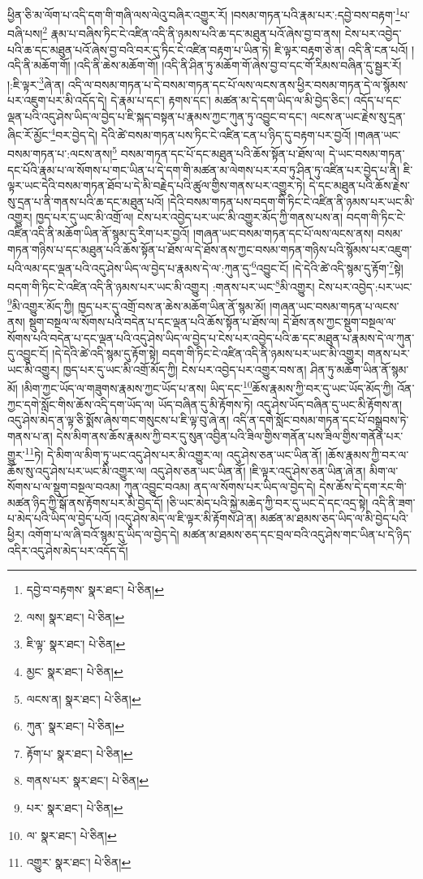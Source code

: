 ཕྱིན་ཅི་མ་ལོག་པ་འདི་དག་གི་གཞི་ལས་ལེའུ་བཞིར་འགྱུར་རོ། །བསམ་གཏན་པའི་རྣམ་པར་:དབྱེ་བས་བརྟག་\footnote{དབྱེ་བ་བརྟགས་  སྣར་ཐང་།  པེ་ཅིན། }པ་བཞི་པས།\footnote{ལས།  སྣར་ཐང་།  པེ་ཅིན། } རྣམ་པ་བཞིས་ཏིང་ངེ་འཛིན་འདི་ནི་ཉམས་པའི་ཆ་དང་མཐུན་པའོ་ཞེས་བྱ་བ་ནས། ངེས་པར་འབྱེད་པའི་ཆ་དང་མཐུན་པའོ་ཞེས་བྱ་བའི་བར་དུ་ཏིང་ངེ་འཛིན་བརྟག་པ་ཡིན་ཏེ། ཇི་ལྟར་བརྟག་ཅེ་ན། འདི་ནི་ངན་པའོ། །འདི་ནི་མཆོག་གོ། །འདི་ནི་ཆེས་མཆོག་གོ། །འདི་ནི་ཤིན་ཏུ་མཆོག་གོ་ཞེས་བྱ་བ་དང་གོ་རིམས་བཞིན་དུ་སྦྱར་རོ། །:ཇི་ལྟར་\footnote{ཇི་ལྟ་  སྣར་ཐང་།  པེ་ཅིན། }ཞེ་ན། འདི་ལ་བསམ་གཏན་པ་དེ་བསམ་གཏན་དང་པོ་ལས་ལངས་ནས་ཕྱིར་བསམ་གཏན་དེ་ལ་སྙོམས་པར་འཇུག་པར་མི་འདོད་དེ། དེ་རྣམ་པ་དང་། རྟགས་དང་། མཚན་མ་དེ་དག་ཡིད་ལ་མི་བྱེད་ཅིང་། འདོད་པ་དང་ལྡན་པའི་འདུ་ཤེས་ཡིད་ལ་བྱེད་པ་ཇི་སྐད་བསྟན་པ་རྣམས་ཀྱང་ཀུན་ཏུ་འབྱུང་བ་དང་། ལངས་ན་ཡང་རྗེས་སུ་དྲན་ཞིང་རོ་མྱོང་\footnote{མྱང་  སྣར་ཐང་།  པེ་ཅིན། }བར་བྱེད་དེ། དེའི་ཚེ་བསམ་གཏན་པས་ཏིང་ངེ་འཛིན་ངན་པ་ཉིད་དུ་བརྟག་པར་བྱའོ། །གཞན་ཡང་བསམ་གཏན་པ་:ལངས་ནས།\footnote{ལངས་ན།  སྣར་ཐང་།  པེ་ཅིན། } བསམ་གཏན་དང་པོ་དང་མཐུན་པའི་ཆོས་སྟོན་པ་ཐོས་ལ། དེ་ཡང་བསམ་གཏན་དང་པོའི་རྣམ་པ་ལ་སོགས་པ་གང་ཡིན་པ་དེ་དག་གི་མཚན་མ་ལེགས་པར་རབ་ཏུ་ཤིན་ཏུ་འཛིན་པར་བྱེད་པ་ནི། ཇི་ལྟར་ཡང་དེའི་བསམ་གཏན་ཐོབ་པ་དེ་མི་བརྗེད་པའི་ཚུལ་གྱིས་གནས་པར་འགྱུར་ཏེ། དེ་དང་མཐུན་པའི་ཆོས་རྗེས་སུ་དྲན་པ་ནི་གནས་པའི་ཆ་དང་མཐུན་པའོ། །དེའི་བསམ་གཏན་པས་བདག་གི་ཏིང་ངེ་འཛིན་ནི་ཉམས་པར་ཡང་མི་འགྱུར། ཁྱད་པར་དུ་ཡང་མི་འགྲོ་ལ། ངེས་པར་འབྱེད་པར་ཡང་མི་འགྱུར་མོད་ཀྱི་གནས་པས་ན། བདག་གི་ཏིང་ངེ་འཛིན་འདི་ནི་མཆོག་ཡིན་ནོ་སྙམ་དུ་རིག་པར་བྱའོ། །གཞན་ཡང་བསམ་གཏན་དང་པོ་ལས་ལངས་ནས། བསམ་གཏན་གཉིས་པ་དང་མཐུན་པའི་ཆོས་སྟོན་པ་ཐོས་ལ་དེ་ཐོས་ནས་ཀྱང་བསམ་གཏན་གཉིས་པའི་སྙོམས་པར་འཇུག་པའི་ལམ་དང་ལྡན་པའི་འདུ་ཤེས་ཡིད་ལ་བྱེད་པ་རྣམས་དེ་ལ་:ཀུན་དུ་\footnote{ཀུན་  སྣར་ཐང་།  པེ་ཅིན། }འབྱུང་ངོ། །དེ་དེའི་ཚེ་འདི་སྙམ་དུ་རྟོག་\footnote{རྟོག་པ་  སྣར་ཐང་།  པེ་ཅིན། }སྟེ། བདག་གི་ཏིང་ངེ་འཛིན་འདི་ནི་ཉམས་པར་ཡང་མི་འགྱུར། :གནས་པར་ཡང་\footnote{གནས་པར་  སྣར་ཐང་།  པེ་ཅིན། }མི་འགྱུར། ངེས་པར་འབྱེད་:པར་ཡང་\footnote{པར་  སྣར་ཐང་།  པེ་ཅིན། }མི་འགྱུར་མོད་ཀྱི། ཁྱད་པར་དུ་འགྲོ་བས་ན་ཆེས་མཆོག་ཡིན་ནོ་སྙམ་མོ། །གཞན་ཡང་བསམ་གཏན་པ་ལངས་ནས། སྡུག་བསྔལ་ལ་སོགས་པའི་བདེན་པ་དང་ལྡན་པའི་ཆོས་སྟོན་པ་ཐོས་ལ། དེ་ཐོས་ནས་ཀྱང་སྡུག་བསྔལ་ལ་སོགས་པའི་བདེན་པ་དང་ལྡན་པའི་འདུ་ཤེས་ཡིད་ལ་བྱེད་པ་ངེས་པར་འབྱེད་པའི་ཆ་དང་མཐུན་པ་རྣམས་དེ་ལ་ཀུན་དུ་འབྱུང་ངོ། །དེ་དེའི་ཚེ་འདི་སྙམ་དུ་རྟོག་སྟེ། བདག་གི་ཏིང་ངེ་འཛིན་འདི་ནི་ཉམས་པར་ཡང་མི་འགྱུར། གནས་པར་ཡང་མི་འགྱུར། ཁྱད་པར་དུ་ཡང་མི་འགྲོ་མོད་ཀྱི། ངེས་པར་འབྱེད་པར་འགྱུར་བས་ན། ཤིན་ཏུ་མཆོག་ཡིན་ནོ་སྙམ་མོ། །མིག་ཀྱང་ཡོད་ལ་གཟུགས་རྣམས་ཀྱང་ཡོད་པ་ནས། ཡིད་དང་\footnote{ལ་  སྣར་ཐང་།  པེ་ཅིན། }ཆོས་རྣམས་ཀྱི་བར་དུ་ཡང་ཡོད་མོད་ཀྱི། འོན་ཀྱང་དགེ་སློང་གིས་ཆོས་འདི་དག་ཡོད་ལ། ཡོད་བཞིན་དུ་མི་རྟོགས་ཏེ། འདུ་ཤེས་ཡོད་བཞིན་དུ་ཡང་མི་རྟོགས་ན། འདུ་ཤེས་མེད་ན་ལྟ་ཅི་སྨོས་ཞེས་གང་གསུངས་པ་ཇི་ལྟ་བུ་ཞེ་ན། འདི་ན་དགེ་སློང་བསམ་གཏན་དང་པོ་བསྒྲུབས་ཏེ་གནས་པ་ན། དེས་མིག་ནས་ཆོས་རྣམས་ཀྱི་བར་དུ་སུན་འབྱིན་པའི་ཟིལ་གྱིས་གནོན་པས་ཟིལ་གྱིས་གནོན་པར་གྱུར་\footnote{འགྱུར་  སྣར་ཐང་།  པེ་ཅིན། }ཏེ། དེ་མིག་ལ་མིག་ཏུ་ཡང་འདུ་ཤེས་པར་མི་འགྱུར་ལ། འདུ་ཤེས་ཅན་ཡང་ཡིན་ནོ། །ཆོས་རྣམས་ཀྱི་བར་ལ་ཆོས་སུ་འདུ་ཤེས་པར་ཡང་མི་འགྱུར་ལ། འདུ་ཤེས་ཅན་ཡང་ཡིན་ནོ། །ཇི་ལྟར་འདུ་ཤེས་ཅན་ཡིན་ཞེ་ན། མིག་ལ་སོགས་པ་ལ་སྡུག་བསྔལ་བའམ། ཀུན་འབྱུང་བའམ། ནད་ལ་སོགས་པར་ཡིད་ལ་བྱེད་དེ། དེས་ཆོས་དེ་དག་རང་གི་མཚན་ཉིད་ཀྱི་སྒོ་ནས་རྟོགས་པར་མི་བྱེད་དོ། །ཅི་ཡང་མེད་པའི་སྐྱེ་མཆེད་ཀྱི་བར་དུ་ཡང་དེ་དང་འདྲ་སྟེ། འདི་ནི་ཟག་པ་མེད་པའི་ཡིད་ལ་བྱེད་པའོ། །འདུ་ཤེས་མེད་ལ་ཇི་ལྟར་མི་རྟོགས་ཤེ་ན། མཚན་མ་ཐམས་ཅད་ཡིད་ལ་མི་བྱེད་པའི་ཕྱིར། འགོག་པ་ལ་ཞི་བའོ་སྙམ་དུ་ཡིད་ལ་བྱེད་དེ། མཚན་མ་ཐམས་ཅད་དང་བྲལ་བའི་འདུ་ཤེས་གང་ཡིན་པ་དེ་ཉིད་འདིར་འདུ་ཤེས་མེད་པར་འདོད་དོ། 